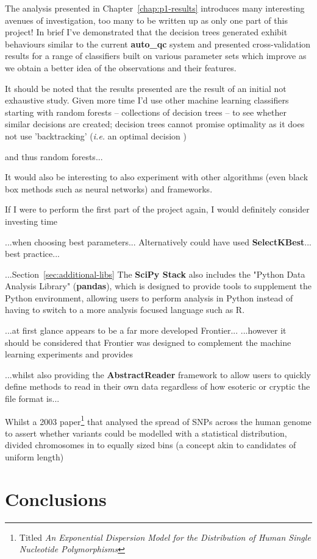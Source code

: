 The analysis presented in Chapter~\ref{chap:p1-results} introduces many
interesting avenues of investigation, too many to be written up as only one part
of this project! In brief I've demonstrated that the decision trees generated
exhibit behaviours similar to the current \textbf{auto\_qc} system and presented
cross-validation results for a range of classifiers built on various parameter
sets which improve as we obtain a better idea of the observations and their
features.

It should be noted that the results presented are the result of an initial not
exhaustive study. Given more time I'd use other machine learning classifiers
starting with random forests -- collections of decision trees -- to see whether
similar decisions are created; decision trees cannot promise optimality as it
does not use 'backtracking' (\textit{i.e.} an optimal decision )

and thus
random forests...

It would also be interesting to also experiment with other algorithms (even black
box methods such as neural networks) and frameworks.

If I were to perform the first part of the project again, I would definitely
consider investing time 






...when choosing best parameters...
Alternatively could have used \textbf{SelectKBest}...
best practice...\citep{sl:tips}

...Section~\ref{sec:additional-libs}
The \textbf{SciPy Stack} also includes the "Python Data Analysis Library"
(\textbf{pandas}), which is designed to provide tools to supplement the Python
environment, allowing users to perform analysis in Python instead of having to
switch to a more analysis focused language such as R.

...at first glance appears to be a far more developed Frontier...
...however it should be considered that Frontier was designed to complement the
machine learning experiments and provides 

...whilst also providing the \textbf{AbstractReader} framework to allow users to
quickly define methods to read in their own data regardless of how esoteric or
cryptic the file format is...


Whilst a 2003 paper\citep{kendal2003exponential}\footnote{Titled \textit{An Exponential
Dispersion Model for the Distribution of Human Single Nucleotide
Polymorphisms}\citep{kendal2003exponential}} that analysed the spread of SNPs
across the human genome to assert whether variants could be modelled with a
statistical distribution, divided chromosomes in to equally sized bins (a
concept akin to candidates of uniform length)

\chapter{Conclusions}

